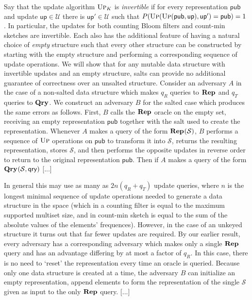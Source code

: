 Say that the update algorithm $\textsc{Up}_K$ is {\em invertible} if for every representation $\mathsf{pub}$ and update $\mathsf{up} \in \mathcal{U}$ there is $\mathsf{up}' \in \mathcal{U}$ such that $P(\textsc{Up}(\textsc{Up}(\mathsf{pub},\mathsf{up}),\mathsf{up}') = \mathsf{pub}) = 1$. In particular, the updates for both counting Bloom filters and count-min sketches are invertible. Each also has the additional feature of having a natural choice of {\em empty} structure such that every other structure can be constructed by starting with the empty structure and performing a corresponding sequence of update operations.
We will show that for any mutable data structure with invertible updates and an empty structure, salts can provide no additional guarantee of correctness over an unsalted structure.  Consider an adversary $A$ in the case of a non-salted data structure which makes $q_R$ queries to $\mathbf{Rep}\hspace{0.5pt}$ and $q_T$ queries to $\mathbf{Qry}\hspace{0.5pt}$. We construct an adversary $B$ for the salted case which produces the same errors as follows. First, $B$ calls the $\mathbf{Rep}\hspace{0.5pt}$ oracle on the empty set, receiving an empty representation $\mathsf{pub}$ together with the salt used to create the representation. Whenever $A$ makes a query of the form $\mathbf{Rep}\hspace{0.5pt}(\mathcal{S})$, $B$ performs a sequence of $\textsc{Up}$ operations on $\mathsf{pub}$ to transform it into $\mathcal{S}$, returns the resulting representation, stores $\mathcal{S}$, and then performs the opposite updates in reverse order to return to the original representation $\mathsf{pub}$. Then if $A$ makes a query of the form $\mathbf{Qry}\hspace{0.5pt}(\mathcal{S},\mathsf{qry})$ [...]

In general this may use as many as $2n(q_R+q_T)$ update queries, where $n$ is the longest minimal sequence of update operations needed to generate a data structure in the space (which in a counting filter is equal to the maximum supported multiset size, and in count-min sketch is equal to the sum of the absolute values of the elements' frequences). However, in the case of an unkeyed structure it turns out that far fewer updates are required. By our earlier result, every adversary has a corresponding adversary which makes only a single $\mathbf{Rep}\hspace{0.5pt}$ query and has an advantage differing by at most a factor of $q_R$. In this case, there is no need to `reset' the representation every time an oracle is queried. Because only one data structure is created at a time, the adversary $B$ can initialize an empty representation, append elements to form the representation of the single $\mathcal{S}$ given as input to the only $\mathbf{Rep}\hspace{0.5pt}$ query. [...]

